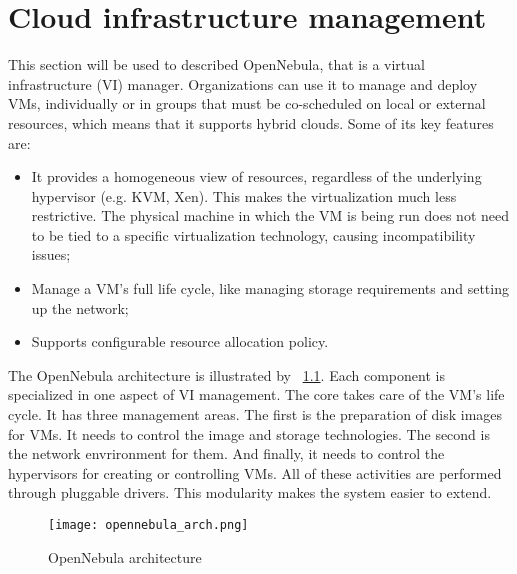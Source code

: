\chapter{\textbf{Cloud infrastructure management}}


This section will be used to described OpenNebula, that is a virtual infrastructure (VI) manager. Organizations can use it to manage and deploy VMs, individually or in groups that must be co-scheduled on local or external resources, which means that it supports hybrid clouds. Some of its key features are:
\begin{itemize}
 \item It provides a homogeneous view of resources, regardless of the underlying hypervisor (e.g. KVM, Xen). This makes the virtualization much less restrictive. The physical machine in which the VM is being run does not need to be tied to a specific virtualization technology, causing incompatibility issues;
  \item Manage a VM's full life cycle, like managing storage requirements and setting up the network;
  \item Supports configurable resource allocation policy.
\end{itemize}

The OpenNebula architecture is illustrated by ~\ref{fig:open_arch}. Each component is specialized in one aspect of VI management. The core takes care of the VM's life cycle. It has three management areas. The first is the preparation of disk images for VMs. It needs to control the image and storage technologies. The second is the network envrironment for them. And finally, it needs to control the hypervisors for creating or controlling VMs. All of these activities are performed through pluggable drivers. This modularity makes the system easier to extend.  


\begin{figure}[ht]
  \centering
 \texttt{[image: opennebula\_arch.png]}
  \caption{OpenNebula architecture}
  \label{fig:open_arch}
\end{figure}








